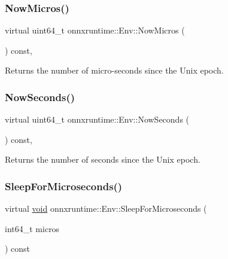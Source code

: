 \subsubsection{\texorpdfstring{Now\+Micros()}{NowMicros()}}
{\footnotesize\ttfamily virtual uint64\+\_\+t onnxruntime\+::\+Env\+::\+Now\+Micros (\begin{DoxyParamCaption}{ }\end{DoxyParamCaption}) const\hspace{0.3cm}{\ttfamily [inline]}, {\ttfamily [virtual]}}



Returns the number of micro-\/seconds since the Unix epoch. 

\mbox{\label{classonnxruntime_1_1Env_a1de6adfcff338e90b34a65803718afdf}} 
\subsubsection{\texorpdfstring{Now\+Seconds()}{NowSeconds()}}
{\footnotesize\ttfamily virtual uint64\+\_\+t onnxruntime\+::\+Env\+::\+Now\+Seconds (\begin{DoxyParamCaption}{ }\end{DoxyParamCaption}) const\hspace{0.3cm}{\ttfamily [inline]}, {\ttfamily [virtual]}}



Returns the number of seconds since the Unix epoch. 

\mbox{\label{classonnxruntime_1_1Env_a2652f151c55c07c900f1e47993e603b8}} 
\subsubsection{\texorpdfstring{Sleep\+For\+Microseconds()}{SleepForMicroseconds()}}
{\footnotesize\ttfamily virtual \mbox{\hyperlink{mlasi_8h_a88f941d423cb2a819b70a1358982b1a6}{void}} onnxruntime\+::\+Env\+::\+Sleep\+For\+Microseconds (\begin{DoxyParamCaption}\item[{int64\+\_\+t}]{micros }\end{DoxyParamCaption}) const\hspace{0.3cm}{\ttfamily [pure virtual]}}

